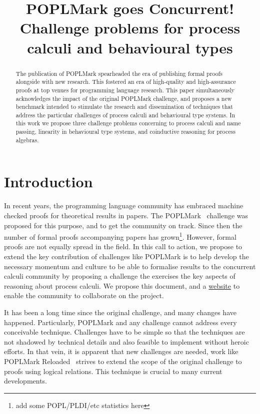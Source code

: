 \documentclass{article}
\begin{document}
\title{POPLMark goes Concurrent!\\Challenge problems for process calculi and behavioural types}

\maketitle

\begin{abstract}
  The publication of POPLMark spearheaded the era of publishing formal
  proofs alongside with new research. This fostered an era of
  high-quality and high-assurance proofs at top venues for programming
  language research. This paper simultaneously acknowledges the impact
  of the original POPLMark challenge, and proposes a new benchmark
  intended to stimulate the research and dissemination of techniques
  that address the particular challenges of process calculi and
  behavioural type systems. In this work we propose three challenge
  problems concerning to process calculi and name passing, linearity
  in behavioural type systems, and coinductive reasoning for process
  algebras.
\end{abstract}

\section{Introduction}

In recent years, the programming language community has embraced
machine checked proofs for theoretical results in papers. The
POPLMark~\cite{Pierce:2005} challenge was proposed for this purpose,
and to get the community on track. Since then the number of formal
proofs accompanying papers has grown\footnote{add some POPL/PLDI/etc
  statistics here}. However, formal proofs are not equally spread in
the field. In this call to action, we propose to extend the key
contribution of challenges like POPLMark is to help develop the
necessary momentum and culture to be able to formalise results to the
concurrent calculi community by proposing a challenge the exercises
the key aspects of reasoning about process calculi. We propose this
document, and a \href{https://concurrentbenchmark.github.io/}{website}
to enable the community to collaborate on the project.

It has been a long time since the original challenge, and many changes
have happened. Particularly, POPLMark and any challenge cannot address
every conceivable technique. Challenges have to be simple so that the
techniques are not shadowed by technical details and also feasible to
implement without heroic efforts. In that vein, it is apparent that
new challenges are needed, work like POPLMark
Reloaded~\cite{Pientka:2019} strives to extend the scope of the
original challenge to proofs using logical relations. This technique
is crucial to many current developments.
\end{document}
